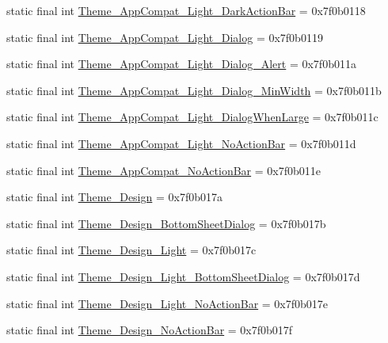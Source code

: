 \begin{CompactItemize}
static final int \hyperlink{classandroid_1_1support_1_1fragment_1_1_r_1_1style_95e973a0d602e23b69efaa632849097c}{Theme\_\-AppCompat\_\-Light\_\-DarkActionBar} = 0x7f0b0118
\item 
static final int \hyperlink{classandroid_1_1support_1_1fragment_1_1_r_1_1style_13751503053dca94774a3f3f1852ddd4}{Theme\_\-AppCompat\_\-Light\_\-Dialog} = 0x7f0b0119
\item 
static final int \hyperlink{classandroid_1_1support_1_1fragment_1_1_r_1_1style_89fd0303b805284784caa2414d967beb}{Theme\_\-AppCompat\_\-Light\_\-Dialog\_\-Alert} = 0x7f0b011a
\item 
static final int \hyperlink{classandroid_1_1support_1_1fragment_1_1_r_1_1style_47dc3394b084aa2c5d434e162c121ff3}{Theme\_\-AppCompat\_\-Light\_\-Dialog\_\-MinWidth} = 0x7f0b011b
\item 
static final int \hyperlink{classandroid_1_1support_1_1fragment_1_1_r_1_1style_8cc4b546bec17866fdcaa4707de1c43a}{Theme\_\-AppCompat\_\-Light\_\-DialogWhenLarge} = 0x7f0b011c
\item 
static final int \hyperlink{classandroid_1_1support_1_1fragment_1_1_r_1_1style_1b9a65f9e70c564c401e9cb97c49bf98}{Theme\_\-AppCompat\_\-Light\_\-NoActionBar} = 0x7f0b011d
\item 
static final int \hyperlink{classandroid_1_1support_1_1fragment_1_1_r_1_1style_8388672d2433daeac1afc1feaa530a75}{Theme\_\-AppCompat\_\-NoActionBar} = 0x7f0b011e
\item 
static final int \hyperlink{classandroid_1_1support_1_1fragment_1_1_r_1_1style_dbd7e8e31babf0b8bc48002a4756f193}{Theme\_\-Design} = 0x7f0b017a
\item 
static final int \hyperlink{classandroid_1_1support_1_1fragment_1_1_r_1_1style_e897b8cbe3160bb4e74d23d80e75dd30}{Theme\_\-Design\_\-BottomSheetDialog} = 0x7f0b017b
\item 
static final int \hyperlink{classandroid_1_1support_1_1fragment_1_1_r_1_1style_37a248d00d814671d352c6e36eb8384d}{Theme\_\-Design\_\-Light} = 0x7f0b017c
\item 
static final int \hyperlink{classandroid_1_1support_1_1fragment_1_1_r_1_1style_9fea7e334b514def352aa7a9388be27e}{Theme\_\-Design\_\-Light\_\-BottomSheetDialog} = 0x7f0b017d
\item 
static final int \hyperlink{classandroid_1_1support_1_1fragment_1_1_r_1_1style_d1672a48757bdd076dd607d7b4075736}{Theme\_\-Design\_\-Light\_\-NoActionBar} = 0x7f0b017e
\item 
static final int \hyperlink{classandroid_1_1support_1_1fragment_1_1_r_1_1style_57f8a0dc505cf5edc2b3b7487f54f380}{Theme\_\-Design\_\-NoActionBar} = 0x7f0b017f

\end{CompactItemize}
